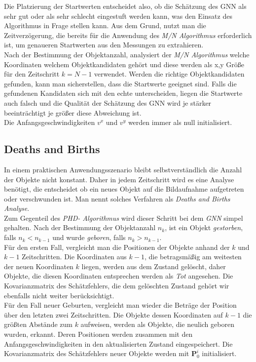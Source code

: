 \documentclass[10pt,a4paper]{article}
\begin{document}
Die Platzierung der Startwerten entscheidet also, ob die Schätzung des GNN als sehr gut oder als sehr schlecht eingestuft werden kann, was den Einsatz des Algorithmus in Frage stellen kann. Aus dem Grund, nutzt man die Zeitverzögerung, die bereits für die Anwendung des \textit{M/N Algorithmus} erforderlich ist, um genaueren Startwerten aus den Messungen zu extrahieren.\\
Nach der Bestimmung der Objektanzahl, analysiert der \textit{M/N Algorithmus} welche Koordinaten welchem Objektkandidaten gehört und diese werden als x,y Größe für den Zeitschritt $k = N-1$ verwendet. Werden die richtige Objektkandidaten gefunden, kann man sicherstellen, dass die Startwerte geeignet sind. Falls die gefundenen Kandidaten sich mit den echte unterscheiden, liegen die Startwerte auch falsch und die Qualität der Schätzung des GNN wird je stärker beeinträchtigt je größer diese Abweichung ist.\\
Die Anfangsgeschwindigkeiten $v^x$ und $v^y$ werden immer als null initialisiert.
\subsection{Deaths and Births}\label{subsub:GNNDeathBirth}
In einem praktischen Anwendungsszenario bleibt selbstverständlich die Anzahl der Objekte nicht konstant. Daher in jedem Zeitschritt wird es eine Analyse benötigt, die entscheidet ob ein neues Objekt auf die Bildaufnahme aufgetreten oder verschwunden ist. Man nennt solches Verfahren als \textit{Deaths and Births Analyse}.\\
Zum Gegenteil des \textit{PHD- Algorithmus} wird dieser Schritt bei dem \textit{GNN } simpel gehalten. Nach der Bestimmung der Objektanzahl $n_k$, ist ein Objekt \textit{gestorben}, falls $n_k < n_{k-1}$ und wurde \textit{geboren}, falls $n_k > n_{k-1}$.\\
Für den ersten Fall, vergleicht man die Positionen der Objekte anhand der $k$ und $k-1$ Zeitschritten. Die Koordinaten aus $k-1$, die betragsmäßig am weitesten der neuen Koordinaten $k$ liegen, werden aus dem Zustand gelöscht, daher Objekte, die diesen Koordinaten entsprechen werden als \textit{Tot} angesehen. Die Kovarianzmatrix des Schätzfehlers, die dem gelöschten Zustand gehört wir ebenfalls nicht weiter berücksichtigt. \\
Für den Fall neuer Geburten, vergleicht man wieder die Beträge der Position über den letzten zwei Zeitschritten. Die Objekte dessen Koordinaten auf $k-1$ die größten Abstände zum $k$ aufweisen, werden als Objekte, die neulich geboren wurden, erkannt. Deren Positionen werden zusammen mit den Anfangsgeschwindigkeiten in den aktualisierten Zustand eingespeichert. Die Kovarianzmatrix des Schätzfehlers neuer Objekte werden mit $\textbf{P}^i_0$ initialisiert.
\newline
\newline
\end{document}
